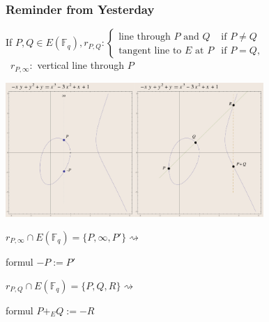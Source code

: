 \documentclass[10pt,handout]{beamer} %
\newcommand{\F}{\mathbb F}
\theoremstyle{definition}
\begin{document}
\begin{frame}
\frametitle{Reminder from Yesterday}

If $P,Q\in E(\F_q), r_{P,Q}:\begin{cases}
                     \text{line through $P$ and }Q &\text{if }P\neq Q\\
                     \text{tangent line to $E$ at }P &\text{if }P=Q,
                    \end{cases}$\\ \ \hfill $r_{P,\infty}:$ vertical line through $P$

\begin{center}
\includegraphics[width=4.9cm]{images/ad15.pdf}\includegraphics[width=4.9cm]{images/add7.pdf}\pause
\end{center}

{$r_{P,\infty}\cap E(\F_q)=\{P,\infty,P'\}$}\hfill$\rightsquigarrow$
{\begin{beamercolorbox}[shadow=true,center,rounded=true,wd=2cm]{formul}
             $-P:=P'$
            \end{beamercolorbox}}\medskip

{$r_{P,Q}\cap E(\F_q)=\{P,Q,R\}$}\hfill$\rightsquigarrow$
{\begin{beamercolorbox}[shadow=true,center,rounded=true,wd=2.9cm]{formul}
$P+_E Q:=-R$
            \end{beamercolorbox}}
\end{frame}
\end{document}
